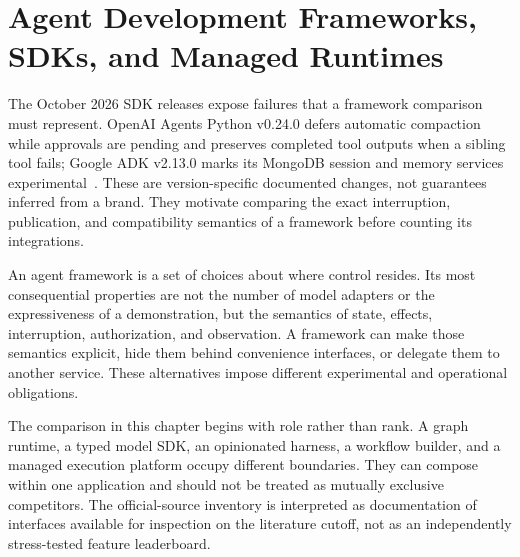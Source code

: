\chapter{Agent Development Frameworks, SDKs, and Managed Runtimes}\label{ch:C22}
The October 2026 SDK releases expose failures that a framework comparison must represent. OpenAI Agents Python v0.24.0 defers automatic compaction while approvals are pending and preserves completed tool outputs when a sibling tool fails; Google ADK v2.13.0 marks its MongoDB session and memory services experimental~\cite{executionrelease02,executionrelease03}. These are version-specific documented changes, not guarantees inferred from a brand. They motivate comparing the exact interruption, publication, and compatibility semantics of a framework before counting its integrations.

An agent framework is a set of choices about where control resides. Its most consequential properties are not the number of model adapters or the expressiveness of a demonstration, but the semantics of state, effects, interruption, authorization, and observation. A framework can make those semantics explicit, hide them behind convenience interfaces, or delegate them to another service. These alternatives impose different experimental and operational obligations.

The comparison in this chapter begins with role rather than rank. A graph runtime, a typed model SDK, an opinionated harness, a workflow builder, and a managed execution platform occupy different boundaries. They can compose within one application and should not be treated as mutually exclusive competitors. The official-source inventory is interpreted as documentation of interfaces available for inspection on the literature cutoff, not as an independently stress-tested feature leaderboard.









